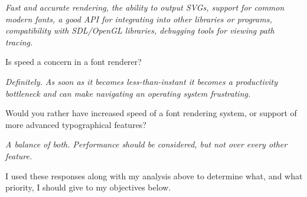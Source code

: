 \documentclass{report}
\begin{document}
\textit{Fast and accurate rendering, the ability to output SVGs, support for
  common modern fonts, a good API for integrating into other libraries or
  programs, compatibility with SDL/OpenGL libraries, debugging tools for viewing
  path tracing.}

Is speed a concern in a font renderer?

\textit{Definitely. As soon as it becomes less-than-instant it becomes a
  productivity bottleneck and can make navigating an operating system
  frustrating.}

Would you rather have increased speed of a font rendering system, or support of more advanced typographical features?

\textit{A balance of both. Performance should be considered, but not over every other feature.}

I used these responses along with my analysis above to determine what, and what
priority, I should give to my objectives below. 
\end{document}
